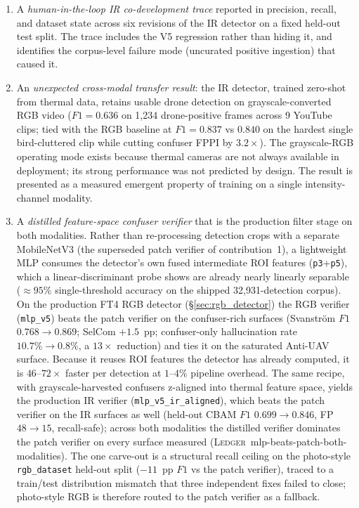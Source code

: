 \documentclass[12pt,a4paper,oneside,openright]{book}
\begin{document}
\begin{enumerate}
    \item A \emph{human-in-the-loop IR co-development trace} reported in precision, recall, and dataset state across six revisions of the IR detector on a fixed held-out test split. The trace includes the V5 regression rather than hiding it, and identifies the corpus-level failure mode (uncurated positive ingestion) that caused it.
    \item An \emph{unexpected cross-modal transfer result}: the IR detector, trained zero-shot from thermal data, retains usable drone detection on grayscale-converted RGB video ($F1=0.636$ on 1{,}234 drone-positive frames across 9 YouTube clips; tied with the RGB baseline at $F1=0.837$ vs $0.840$ on the hardest single bird-cluttered clip while cutting confuser FPPI by $3.2\times$). The grayscale-RGB operating mode exists because thermal cameras are not always available in deployment; its strong performance was not predicted by design. The result is presented as a measured emergent property of training on a single intensity-channel modality.
    \item A \emph{distilled feature-space confuser verifier} that is the production filter stage on both modalities. Rather than re-processing detection crops with a separate MobileNetV3 (the superseded patch verifier of contribution~1), a lightweight MLP consumes the detector's own fused intermediate ROI features (\texttt{p3}+\texttt{p5}), which a linear-discriminant probe shows are already nearly linearly separable ($\approx 95\%$ single-threshold accuracy on the shipped 32{,}931-detection corpus). On the production FT4 RGB detector (\S\ref{sec:rgb_detector}) the RGB verifier (\texttt{mlp\_v5}) beats the patch verifier on the confuser-rich surfaces (Svanstr\"om $F1$ $0.768\to0.869$; SelCom $+1.5$~pp; confuser-only hallucination rate $10.7\%\to0.8\%$, a $13\times$ reduction) and ties it on the saturated Anti-UAV surface. Because it reuses ROI features the detector has already computed, it is $46$--$72\times$ faster per detection at $1$--$4\%$ pipeline overhead. The same recipe, with grayscale-harvested confusers z-aligned into thermal feature space, yields the production IR verifier (\texttt{mlp\_v5\_ir\_aligned}), which beats the patch verifier on the IR surfaces as well (held-out CBAM $F1$ $0.699\to0.846$, FP $48\to15$, recall-safe); across both modalities the distilled verifier dominates the patch verifier on every surface measured (\textsc{Ledger}~mlp-beats-patch-both-modalities). The one carve-out is a structural recall ceiling on the photo-style \texttt{rgb\_dataset} held-out split ($-11$~pp $F1$ vs the patch verifier), traced to a train/test distribution mismatch that three independent fixes failed to close; photo-style RGB is therefore routed to the patch verifier as a fallback.

\end{enumerate}
\end{document}
